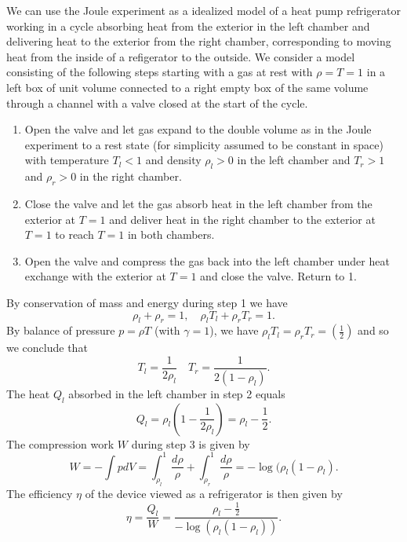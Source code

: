 We can use the Joule experiment as a idealized model of a heat pump refrigerator 
working in a cycle absorbing heat from the exterior in the left chamber and delivering heat 
to the exterior from the right chamber, corresponding to moving heat from the inside of a refigerator 
to the outside. We consider a model consisting of the following steps starting with a gas at rest 
with $\rho =T=1$ in a left box of unit volume connected to a right empty box of the same volume
through a channel with a valve closed at the start of the cycle.  
\begin{enumerate}
\item Open the valve and let gas expand to the double volume as in the Joule experiment to a rest state (for simplicity assumed to be constant in space)
with temperature $T_l<1$ and density $\rho_l>0$ in the left chamber and $T_r>1$ and $\rho_r>0$ in the right chamber.
\item Close the valve and let the gas absorb heat in the left chamber from the exterior at $T=1$ and deliver heat in the right chamber to the exterior at $T = 1$ to reach $T=1$ in both chambers.
\item Open the valve and compress the gas back into the left chamber under heat exchange with the exterior at $T = 1$ and close the valve. Return to 1. 
\end{enumerate}
By conservation of mass and energy during step 1 we have
\begin{equation}
\rho_l+\rho_r = 1, \quad \rho_lT_l + \rho_rT_r =1.
\end{equation}
By balance of pressure $p=\rho T$ (with $\gamma =1$), we have $\rho_lT_l = \rho_rT_r = (\frac{1}{2})$  and so we conclude that
\begin{equation}
T_l = \frac{1}{2\rho_l}\quad T_r = \frac{1}{2(1-\rho_l)}.
\end{equation}
The heat $Q_l$ absorbed in the left chamber in step 2 equals
\begin{equation}
Q_l=\rho_l(1-\frac{1}{2\rho_l})=\rho_l-\frac{1}{2}.
\end{equation}
The compression work $W$ during step 3 is given by
\begin{equation}
W=-\int pdV = \int_{\rho_l}^1 \frac{d\rho}{\rho} + \int_{\rho_r}^1 \frac{d\rho}{\rho}= -\log(\rho_l (1-\rho_l ).
\end{equation}
The efficiency $\eta$ of the device viewed as a refrigerator is then given by
\begin{equation}
\eta =\frac{Q_l}{W}= \frac{\rho_l-\frac{1}{2}}{-\log(\rho_l (1-\rho_l ))}.
\end{equation}

